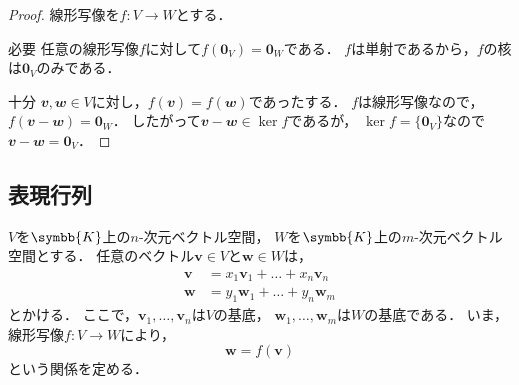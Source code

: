 \documentclass[../sotsu.tex]{subfiles}
\begin{document}
\begin{proof}
    線形写像を$f \colon V \to W$とする．

    \textsf{必要} \quad 
    任意の線形写像$f$に対して$f(\symbf{0}_V) = \symbf{0}_W$である．
    $f$は単射であるから，$f$の核は$\symbf{0}_V$のみである．

    \textsf{十分} \quad 
    $𝒗, 𝒘 \in V$に対し，$f(𝒗) = f(𝒘)$であったする．
    $f$は線形写像なので，$f(𝒗 - 𝒘) = \symbf{0}_W$．
    したがって$𝒗 - 𝒘 \in \ker f$であるが，
    $\ker f = \{ \symbf{0}_V \}$なので$𝒗 - 𝒘 = \symbf{0}_V$．
\end{proof}



\subsection{表現行列}
\label{representation-matrix}

$V$を$\symbb{K}$上の$n$-次元ベクトル空間，
$W$を$\symbb{K}$上の$m$-次元ベクトル空間とする．
任意のベクトル$\symbf{v} \in V$と$\symbf{w} \in W$は，
\begin{equation*}
    \begin{aligned}
        \symbf{v} &= x_1 \symbf{v}_1 + \dots + x_n \symbf{v}_n  \\
        \symbf{w} &= y_1 \symbf{w}_1 + \dots + y_n \symbf{w}_m
    \end{aligned}
\end{equation*}
とかける．
ここで，$\symbf{v}_1, \dots, \symbf{v}_n$は$V$の基底，
$\symbf{w}_1, \dots, \symbf{w}_m$は$W$の基底である．
いま，線形写像$f \colon V \to W$により，
\begin{equation*}
    \symbf{w} = f(\symbf{v})
\end{equation*}
という関係を定める．
\end{document}
